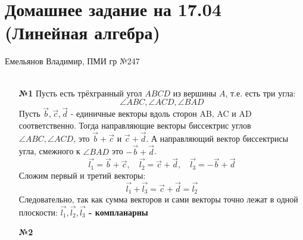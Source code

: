 \documentclass[a4paper]{article}
\begin{document}
\section*{Домашнее задание на 17.04 (Линейная алгебра)}
 {\large Емельянов Владимир, ПМИ гр №247}\\\\
\begin{enumerate}
    \item[\textbf{№1}]Пусть есть трёхгранный угол $ABCD$ из вершины $A$, т.е. есть три угла: 
    $$\angle ABC, \angle ACD, \angle BAD$$
    Пусть $\vec{b}, \vec{c}, \vec{d}$ - единичные векторы вдоль сторон AB, AC и AD соответственно.
    Тогда направляющие векторы биссектрис углов $\angle ABC, \angle ACD$, это $\vec{b}+ \vec{c}$ и $ \vec{c}+\vec{d}$.
    А направляющий вектор биссектрисы угла, смежного к $\angle BAD$ это $-\vec{b}+\vec{d}$.
    $$\vec{l_1} = \vec{b}+ \vec{c}, \quad \vec{l_2} = \vec{c}+\vec{d}, \quad \vec{l_3} = -\vec{b}+\vec{d}$$
    Сложим первый и третий векторы:
    $$\vec{l_1} + \vec{l_3 } =  \vec{c}+\vec{d} = \vec{l_2}$$
    Следовательно, так как сумма векторов и сами векторы точно лежат в одной плоскости:
     \textbf{$\vec{l_1}, \vec{l_2}, \vec{l_3}$ - компланарны}\\


    \item[\textbf{№2}]
\end{enumerate}
\end{document}
